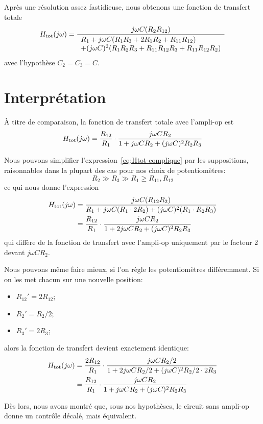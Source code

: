 Après une résolution assez fastidieuse, nous obtenons une fonction de transfert
totale
\begin{equation} \label{eq:Htot-complique}
    H_{\mathrm{tot}}(j\omega) = \frac{j\omega C(R_2R_{12})}
    {\begin{array}{l}
            R_1 + j\omega C(R_1R_3+2R_1R_2+R_{11}R_{12})\\
        + (j\omega C)^2(R_1R_2R_3 + R_{11}R_{12}R_3 + R_{11}R_{12}R_2)
\end{array}}
\end{equation}
avec l'hypothèse $C_2 = C_3 = C$.

\section{Interprétation}

À titre de comparaison, la fonction de transfert totale avec l'ampli-op est
\begin{equation}
    H_{\mathrm{tot}}(j\omega) = \frac{R_{12}}{R_1}\cdot
    \frac{j\omega CR_2}
    {1+j\omega CR_2 + (j\omega C)^2R_2R_3}
\end{equation}

Nous pouvons simplifier l'expression~\eqref{eq:Htot-complique}
par les suppositions, raisonnables dans la plupart des cas
pour nos choix de potentiomètres:
\begin{equation}
    R_2 \gg R_3 \gg R_1 \geq R_{11},R_{12}
\end{equation}
ce qui nous donne l'expression
\begin{equation}
    \begin{split}
        H_{\mathrm{tot}}(j\omega) &= \frac{j\omega C (R_{12} R_2)}
        {R_1 + j\omega C(R_1\cdot 2R_2) + (j\omega C)^2(R_1\cdot R_2R_3)} \\
        &= \frac{R_{12}}{R_1}\cdot
        \frac{j\omega C R_2}{1+2j\omega CR_2 + (j\omega C)^2R_2R_3}
    \end{split}
\end{equation}
qui diffère de la fonction de transfert avec l'ampli-op uniquement
par le facteur 2 devant $j\omega CR_2$.

Nous pouvons même faire mieux,
si l'on règle les potentiomètres différemment.
Si on les met chacun sur une nouvelle position:
\begin{itemize}
    \item $R_{12}' = 2R_{12}$;
    \item $R_2' = R_2/2$;
    \item $R_3' = 2R_3$;
\end{itemize}
alors la fonction de transfert devient exactement identique:
\begin{equation}
    \begin{split}
        H_{\mathrm{tot}}(j\omega) &= \frac{2R_{12}}{R_1} \cdot\frac{j\omega C R_2/2}
        {1+2j\omega CR_2/2 + (j\omega C)^2R_2/2\cdot 2R_3}\\
        &= \frac{R_{12}}{R_1}\cdot\frac{j\omega CR_2}
        {1+j\omega CR_2 + (j\omega C)^2R_2R_3}
    \end{split}
\end{equation}

Dès lors, nous avons montré que, sous nos hypothèses, le circuit sans ampli-op
donne un contrôle décalé, mais équivalent.
